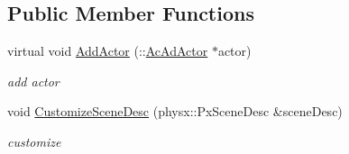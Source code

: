 \subsection*{Public Member Functions}
\begin{DoxyCompactItemize}
\item 
\hypertarget{classContent_1_1Physics_1_1PhysicsScenePhysX_a98bef755d465491e2ac8b2e782b404d9}{
virtual void \hyperlink{classContent_1_1Physics_1_1PhysicsScenePhysX_a98bef755d465491e2ac8b2e782b404d9}{AddActor} (::\hyperlink{classContent_1_1Actor_1_1Admin_1_1Actor}{AcAdActor} $\ast$actor)}
\label{classContent_1_1Physics_1_1PhysicsScenePhysX_a98bef755d465491e2ac8b2e782b404d9}

\begin{DoxyCompactList}\small\item\em add actor \item\end{DoxyCompactList}\item 
\hypertarget{classContent_1_1Physics_1_1PhysicsScenePhysX_a5f6c91e71b4a5f610e50ef8fec4d40ea}{
void \hyperlink{classContent_1_1Physics_1_1PhysicsScenePhysX_a5f6c91e71b4a5f610e50ef8fec4d40ea}{CustomizeSceneDesc} (physx::PxSceneDesc \&sceneDesc)}
\label{classContent_1_1Physics_1_1PhysicsScenePhysX_a5f6c91e71b4a5f610e50ef8fec4d40ea}

\begin{DoxyCompactList}\small\item\em customize \item\end{DoxyCompactList}\end{DoxyCompactItemize}
